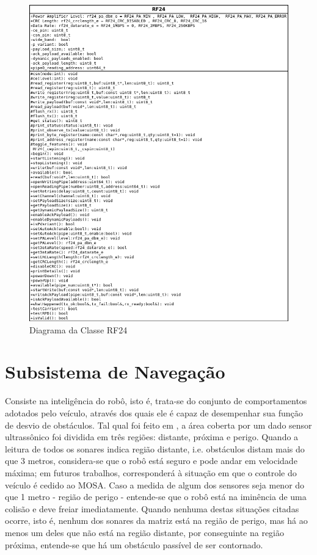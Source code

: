   \begin{figure}[H]
    \centering
    \includegraphics[width=0.5 \linewidth]{../../Imagens/RF24_class.png}
    \caption{Diagrama da Classe RF24} %
    \label{RF24_ClassDiag}
  \end{figure}
\section{Subsistema de Navegação} %
Consiste na inteligência  do robô, isto é, trata-se do conjunto de comportamentos adotados pelo veículo, através dos quais ele é capaz de 
desempenhar sua função de desvio de obstáculos. %
Tal qual foi feito em , a área coberta por um dado sensor ultrassônico foi dividida em três regiões: distante, próxima e perigo.
Quando a leitura de todos os sonares indica região distante, i.e. obstáculos distam mais do que 3 metros, considera-se que o robô 
está seguro e pode andar em velocidade máxima; em futuros trabalhos, corresponderá à situação em que o controle do veículo é cedido ao MOSA.
Caso a medida de algum dos sensores seja menor do que 1 metro - região de perigo - entende-se que o robô está na iminência de uma colisão e deve 
freiar imediatamente.
Quando nenhuma destas situações citadas ocorre, isto é, nenhum dos sonares da matriz está na região de perigo, mas há ao menos um deles que não está 
na região distante, por conseguinte na região próxima, entende-se que há um obstáculo passível de ser contornado.

